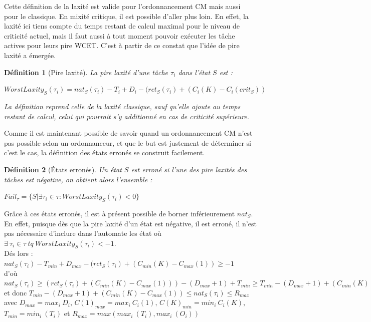 \documentclass[12pt,a4paper,oneside]{book}
\theoremstyle{break}
\newtheorem{defin}{Définition}[chapter]
\theoremstyle{breakplain}
\begin{document}
Cette définition de la laxité est valide pour l'ordonnancement CM mais aussi pour le classique. En mixité critique, il est possible d'aller plus loin. En effet, la laxité ici tiens compte du temps restant de calcul maximal pour le niveau de criticité actuel, mais il faut aussi à tout moment pouvoir exécuter les tâche actives pour leurs pire WCET. C'est à partir de ce constat que l'idée de pire laxité a émergée.

\begin{defin}[Pire laxité]
\label{spo:worstlaxity}
La pire laxité d'une tâche $\tau_i$ dans l'état $S$ est :

$ WorstLaxity_S(\tau_i) = nat_S(\tau_i) -T_i + D_i - (rct_S(\tau_i) + (C_i(K)-C_i(crit_S))
$

La définition reprend celle de la laxité classique, sauf qu'elle ajoute au temps restant de calcul, celui qui pourrait s'y additionné en cas de criticité supérieure.
\end{defin}

Comme il est maintenant possible de savoir quand un ordonnancement CM n'est pas possible selon un ordonnanceur, et que le but est justement de déterminer si c'est le cas, la définition des états erronés se construit facilement.

\begin{defin}[États erronés]
\label{spo:failstate}
Un état $S$ est erroné si l'une des pire laxités des tâches est négative, on obtient alors l'ensemble :

$Fail_\tau = \{S|\exists \tau_i \in \tau : WorstLaxity_S(\tau_i) < 0  \}$\\
\end{defin}

Grâce à ces états erronés, il est à présent possible de borner inférieurement $nat_S$. En effet, puisque dès que la pire laxité d'un état est négative, il est erroné, il n'est pas nécessaire d'inclure dans l'automate les état où $\exists\ \tau_i \in \tau\ tq\ WorstLaxity_S(\tau_i) < -1$.\\

Dés lors : $nat_S(\tau_i) -T_{min} + D_{max} - (rct_S(\tau_i) + (C_{min}(K)-C_{max}(1)) \geq -1$\\
d'où $nat_S(\tau_i) \geq (rct_S(\tau_i) + (C_{min}(K)-C_{max}(1))) - (D_{max}+1) + T_{min} \geq T_{min}-(D_{max}+1) + (C_{min}(K)-C_{max}(1))$\\
et donc $T_{min}-(D_{max}+1)+ (C_{min}(K)-C_{max}(1)) \leq nat_S(\tau_i) \leq R_{max}$\\
avec $D_{max} = max_i\ D_i$, $C(1)_{max} = max_i\ C_i(1)$, $C(K)_{min} = min_i\ C_i(K)$, $T_{min} = min_i\ (T_i)$ et $R_{max} = max(max_i\ (T_i), max_i\ (O_i))$\\
\end{document}
